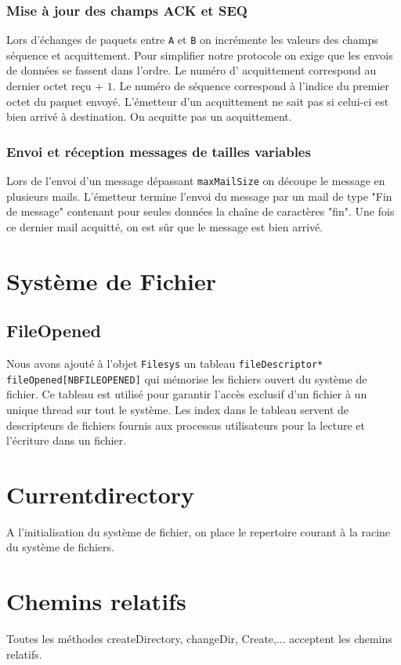 \documentclass[11pt]{article}
\theoremstyle{definition}
\theoremstyle{definition}
\begin{document}
\subsubsection{Mise à jour des champs ACK et SEQ}
Lors d'échanges de paquets entre \texttt{A} et \texttt{B} on incrémente les valeurs des champs séquence et acquittement. Pour simplifier notre protocole on exige que les envois de données se fassent dans l'ordre. Le numéro d' acquittement correspond au dernier octet reçu + $1$. Le numéro de séquence correspond à l'indice du premier octet du paquet envoyé. L'émetteur d'un acquittement ne sait pas si celui-ci est bien arrivé à destination. On acquitte pas un acquittement. 

\subsubsection{ Envoi et réception messages de tailles variables}
Lors de l'envoi d'un message dépassant \texttt{maxMailSize} on découpe le message en plusieurs mails.
L'émetteur termine l'envoi du message par un mail de type "Fin de message" contenant pour seules données
la chaîne de caractères "fin". Une fois ce dernier mail acquitté, on est sûr que le message est bien arrivé.

\section{Système de Fichier}

\subsection{FileOpened}
Nous avons ajouté à l'objet \texttt{Filesys} un tableau \texttt{fileDescriptor* fileOpened[NBFILEOPENED]} qui mémorise les fichiers ouvert du système de fichier. Ce tableau est utilisé pour garantir l'accès exclusif d'un fichier à un unique thread sur tout le système. Les index dans le tableau servent de descripteurs de fichiers fournis aux processus utilisateurs pour la lecture et l'écriture dans un fichier.

\section{Currentdirectory}
A l'initialisation du système de fichier, on place le repertoire courant à la racine du système de fichiers.

\section{Chemins relatifs}
Toutes les méthodes createDirectory, changeDir, Create,... acceptent les chemins relatifs.
\end{document}
